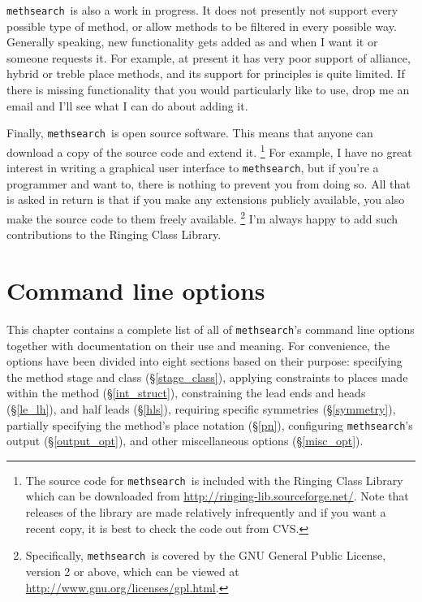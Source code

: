 \documentclass[a4paper,11pt,oneside]{book}
\def\methsearch{\texttt{meth\-search}}
\newcommand{\sref}[1]{\hyperref[#1]{\S\ref{#1}}}
\begin{document}
\methsearch\ is also a work in progress.  
It does not presently not support every possible type of method, 
or allow methods to be filtered in every possible way.
Generally speaking, new functionality gets added as and when I want it
or someone requests it.  For example, at present it has very poor support 
of alliance, hybrid or treble place methods,%
and its support for principles
is quite limited.
If there is missing functionality that you would particularly like to use, 
drop me an email and I'll see what I can do about adding it.

Finally, \methsearch\ is open source software.
This means that anyone 
can download a copy of the source code and extend it.%
\footnote{The source code for \methsearch\ is included with the 
Ringing Class Library which can be downloaded from 
\url{http://ringing-lib.sourceforge.net/}.  Note
that releases of the library are made relatively infrequently and if you
want a recent copy, it is best to check the code out from CVS.}
For example, I have no great interest in writing a graphical user interface 
to \methsearch, but if you're a programmer and want to, there is nothing to
prevent you from doing so.  All that is asked in return is that if you
make any extensions publicly available, you also make the source code to them
freely available.%
\footnote{Specifically, \methsearch\ is covered by the GNU General Public 
License, version 2 or above, which can be viewed at
\url{http://www.gnu.org/licenses/gpl.html}.}
I'm always happy to add such contributions to the Ringing Class Library.

\chapter{Command line options}

This chapter contains a complete list of all of \methsearch's command
line options together with documentation on their use and meaning.
For convenience, the options have been divided into eight sections based
on their purpose: specifying the method stage and class (\sref{stage_class}),
applying constraints to places made within the method (\sref{int_struct}),
constraining the lead ends and heads (\sref{le_lh}), and half leads 
(\sref{hls}), requiring specific symmetries (\sref{symmetry}),
partially specifying the method's place notation (\sref{pn}),
configuring \methsearch's output (\sref{output_opt}), and other 
miscellaneous options (\sref{misc_opt}).
\end{document}
